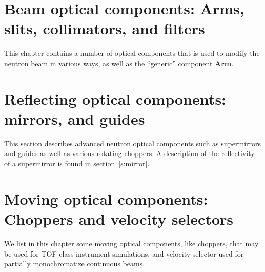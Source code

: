
\chapter{Beam optical components:
Arms, slits, collimators, and filters}
This chapter contains a number of optical components
that is used to modify the neutron beam in various ways,
as well as the ``generic'' component \textbf{Arm}.









\newpage




\newpage
\chapter{Reflecting optical components: mirrors, and guides}

This section describes advanced neutron optical
components such as supermirrors and guides as well as various rotating choppers.
A description of the reflectivity of a supermirror is found
in section~\ref{s:mirror}.



\chapter{Moving optical components:
Choppers and velocity selectors}
We list in this chapter some moving optical components,
like choppers, that may be used for TOF class instrument simulations,
and velocity selector used for partially monochromatize continuous beams.



\newpage




\newpage



\newpage

